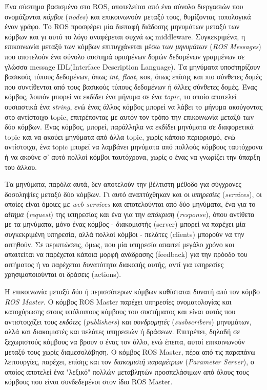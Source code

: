 \bigskip
Ένα σύστημα βασισμένο στο ROS, αποτελείται από ένα σύνολο διεργασιών που ονομάζονται \textit{κόμβοι} (\textit{nodes}) και επικοινωνούν μεταξύ τους, θυμίζοντας τοπολογικά έναν γράφο. Το ROS προσφέρει μία διεπαφή διάδοσης μηνυμάτων μεταξύ των κόμβων και γι αυτό το λόγο αναφέρεται συχνά ως middleware. Συγκεκριμένα, η επικοινωνία μεταξύ των κόμβων επιτυγχάνεται μέσω των \textit{μηνυμάτων} (\textit{ROS Messages}) που αποτελούν ένα σύνολο αυστηρά ορισμένων δομών δεδομένων γραμμένων σε γλώσσα message IDL(Interface Description Language). Τα μηνύματα υποστηρίζουν βασικούς τύπους δεδομένων, όπως \textit{int}, \textit{float}, κοκ, όπως επίσης και πιο σύνθετες δομές που συντίθενται από τους βασικούς τύπους δεδομένων ή άλλες σύνθετες δομές. Ένας κόμβος, λοιπόν μπορεί να εκδίδει ένα μήνυμα σε ένα \textit{topic}, το οποίο αποτελεί ουσιαστικά ένα \textit{string}, ενώ ένας άλλος κόμβος μπορεί να λάβει το μήνυμα ακούγοντας στο αντίστοιχο topic, επιτρέποντας με αυτόν τον τρόπο την επικοινωνία μεταξύ των δύο κόμβων. Ένας κόμβος, μπορεί, παράλληλα να εκδίδει μηνύματα σε διαφορετικά topic και να ακούει μηνύματα από άλλα topic, χωρίς κάποιο περιορισμό, ενώ αντίστοιχα, ένα topic μπορεί να λαμβάνει μηνύματα από πολλούς κόμβους ταυτόχρονα ή να ακούνε σ' αυτό πολλοί κόμβοι ταυτόχρονα, χωρίς ο ένας να γνωρίζει την ύπαρξη του άλλου.

\bigskip
Τα μηνύματα, παρόλα αυτά, δεν αποτελούν την βέλτιστη μέθοδο για σύγχρονες δοσοληψίες μεταξύ δύο κόμβων. Γι αυτό αναπτύχθηκαν και οι \textit{υπηρεσίες} (\textit{services}), οι οποίες είναι όμοιες με \textit{web services} και αποτελούνται από δύο μηνύματα, ένα για το \textit{αίτημα} (\textit{request}) της υπηρεσίας και ένα για την \textit{απόκριση} (\textit{response}), όπου αντίθετα με τα μηνύματα, μόνο ένας κόμβος - διακομιστής (server) μπορεί να παρέχει μία συγκεκριμένη υπηρεσία, αλλά πολλοί κόμβοι - πελάτες (clients) μπορούν να την αιτηθούν. Σε περιπτώσεις, όμως, που μία υπηρεσία απαιτεί μεγάλο χρόνο και απαιτείται να παρέχεται κάποια μορφή ανάδρασης (feedback) για την πρόοδο του αιτήματος ή να παρέχεται δυνατότητα διακοπής αυτής, αντί για υπηρεσίες χρησιμοποιούνται οι δράσεις (actions). 

\bigskip
Η επικοινωνία μεταξύ δύο ή περισσότερων κόμβων καθίσταται δυνατή από τον κόμβο \textit{ROS Master}. Ο κόμβος ROS Master παρέχει υπηρεσίες ονοματολογίας και κατοχύρωσης στους υπόλοιπους κόμβους του συστήματος και είναι αυτός που αντιστοιχίζει τους \textit{εκδότες} (\textit{publishers}) και \textit{συνδρομητές} (\textit{susbscribers}) μηνυμάτων, αλλά και διακομιστές και πελάτες υπηρεσιών ή δράσεων. Επιτρέπει, δηλαδή σε ξεχωριστούς κόμβους να βρουν ο ένας τον άλλο, ενώ έπειτα, αυτοί επικοινωνούν μεταξύ τους χωρίς διαμεσολάβηση. Ο κόμβος ROS Master, πέρα από τις παραπάνω λειτουργίες, παρέχει, επίσης και τον \textit{διακομιστή παραμέτρων} (\textit{Parameter Server}), ο οποίος αποτελεί ένα "λεξικό" πολλών μεταβλητών προσπελάσιμων από όλους τους κόμβους που είναι συνδεδεμένοι στον ίδιο ROS Master.


